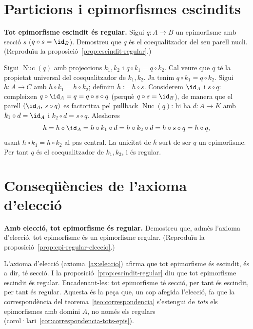 \section{Particions i epimorfismes escindits}\label{prac:particions}

\begin{exercici}
\textbf{Tot epimorfisme escindit és regular.} Sigui \(q\colon A\to B\) un epimorfisme amb secció \(s\) (\(q\circ s=\id_B\)). Demostreu que \(q\) és el coequalitzador del seu parell nucli. (Reproduïu la proposició~\ref{prop:escindit-regular}.)
\end{exercici}
\begin{solucio}
Sigui \(\operatorname{Nuc}(q)\) amb projeccions \(k_1,k_2\) i \(q\circ k_1=q\circ k_2\). Cal veure que \(q\) té la propietat universal del coequalitzador de \(k_1,k_2\). Ja tenim \(q\circ k_1=q\circ k_2\). Sigui \(h\colon A\to C\) amb \(h\circ k_1=h\circ k_2\); definim \(\bar h:=h\circ s\). Considerem \(\id_A\) i \(s\circ q\): compleixen \(q\circ\id_A=q=q\circ s\circ q\) (perquè \(q\circ s=\id_B\)), de manera que el parell \((\id_A,\,s\circ q)\) es factoritza pel pullback \(\operatorname{Nuc}(q)\): hi ha \(d\colon A\to K\) amb \(k_1\circ d=\id_A\) i \(k_2\circ d=s\circ q\). Aleshores
\[
h=h\circ\id_A=h\circ k_1\circ d=h\circ k_2\circ d=h\circ s\circ q=\bar h\circ q,
\]
usant \(h\circ k_1=h\circ k_2\) al pas central. La unicitat de \(\bar h\) surt de ser \(q\) un epimorfisme. Per tant \(q\) és el coequalitzador de \(k_1,k_2\), i és regular.
\end{solucio}

\section{Conseqüències de l'axioma d'elecció}\label{prac:eleccio}

\begin{exercici}
\textbf{Amb elecció, tot epimorfisme és regular.} Demostreu que, admès l'axioma d'elecció, tot epimorfisme és un epimorfisme regular. (Reproduïu la proposició~\ref{prop:epi-regular-eleccio}.)
\end{exercici}
\begin{solucio}
L'axioma d'elecció (axioma~\ref{ax:eleccio}) afirma que tot epimorfisme és escindit, és a dir, té secció. I la proposició~\ref{prop:escindit-regular} diu que tot epimorfisme escindit és regular. Encadenant-les: tot epimorfisme té secció, per tant és escindit, per tant és regular. Aquesta és la peça que, un cop afegida l'elecció, fa que la correspondència del teorema~\ref{teo:correspondencia} s'estengui de \emph{tots} els epimorfismes amb domini \(A\), no només els regulars (corol·lari~\ref{cor:correspondencia-tots-epis}).
\end{solucio}

